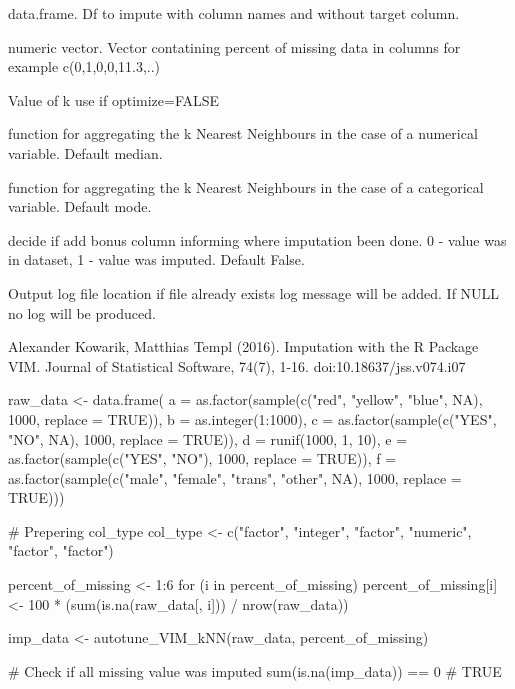 \documentclass[letterpaper]{book}
\begin{document}
\begin{Arguments}
\begin{ldescription}
\item[\code{df}] data.frame. Df to impute with column names and without  target column.

\item[\code{percent\_of\_missing}] numeric vector. Vector contatining percent of missing data in columns for example  c(0,1,0,0,11.3,..)

\item[\code{k}] Value of k use if optimize=FALSE

\item[\code{numFun}] function for aggregating the k Nearest Neighbours in the case of a numerical variable. Default median.

\item[\code{catFun}] function for aggregating the k Nearest Neighbours in the case of a categorical variable. Default mode.

\item[\code{col\_0\_1}] decide if add bonus column informing where imputation been done. 0 - value was in dataset, 1 - value was imputed. Default False.

\item[\code{out\_file}] Output log file location if file already exists log message will be added. If NULL no log will be produced.
\end{ldescription}
\end{Arguments}
%
\begin{References}\relax
Alexander Kowarik, Matthias Templ (2016). Imputation with the R Package VIM. Journal of Statistical Software, 74(7), 1-16. doi:10.18637/jss.v074.i07
\end{References}
%
\begin{Examples}
\begin{ExampleCode}
{
  raw_data <- data.frame(
    a = as.factor(sample(c("red", "yellow", "blue", NA), 1000, replace = TRUE)),
    b = as.integer(1:1000),
    c = as.factor(sample(c("YES", "NO", NA), 1000, replace = TRUE)),
    d = runif(1000, 1, 10),
    e = as.factor(sample(c("YES", "NO"), 1000, replace = TRUE)),
    f = as.factor(sample(c("male", "female", "trans", "other", NA), 1000, replace = TRUE)))

  # Prepering col_type
  col_type <- c("factor", "integer", "factor", "numeric", "factor", "factor")

  percent_of_missing <- 1:6
  for (i in percent_of_missing) {
    percent_of_missing[i] <- 100 * (sum(is.na(raw_data[, i])) / nrow(raw_data))
  }


  imp_data <- autotune_VIM_kNN(raw_data, percent_of_missing)

  # Check if all missing value was imputed
  sum(is.na(imp_data)) == 0
  # TRUE
}
\end{ExampleCode}
\end{Examples}
\end{document}
